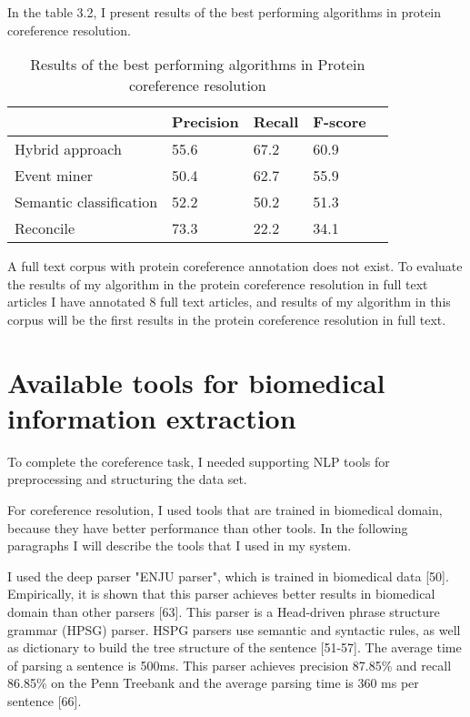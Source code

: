  In the table 3.2, I present results of the best performing algorithms in protein coreference resolution.
\begin{table}[h]
\centering
  \begin{center}
  \centering
 	\begin{tabular}{L{4.2cm} C{2cm} C{2cm} C{2cm}  @{}m{0pt}@{}} 
 		
  		& Precision & Recall & F-score& \\ [1.1ex] 
 		\hline
 		Hybrid approach & 55.6 & 67.2 & 60.9& \\ [1.1ex] 
 		\hline
 		Event miner & 50.4 & 62.7 & 55.9& \\ [1.1ex] 
 		\hline
 		Semantic classification & 52.2 & 50.2 & 51.3& \\ [1.1ex] 
 		\hline
 		Reconcile & 73.3 & 22.2 & 34.1& \\ [1.1ex] 
 		\hline
	\end{tabular}
  \end{center} 
  \caption{Results of the best performing algorithms in Protein coreference resolution}
  \label{table3.2}
\end{table}

A full text corpus with protein coreference annotation does not exist. To evaluate the results of my algorithm in the protein coreference resolution in full text articles I have annotated 8 full text articles, and results of my algorithm in this corpus will be the first  results in the protein coreference resolution in full text.
 
\section{Available tools for biomedical information extraction}

To complete the coreference task, I needed supporting NLP tools for preprocessing and structuring the data set.

For coreference resolution, I used tools that are trained in biomedical domain, because they have better performance than other tools. In the following paragraphs I will describe the tools that I used in my system.

I used the deep parser "ENJU parser", which is trained in biomedical data [50]. Empirically, it is shown that this parser achieves better results in biomedical domain than other parsers [63]. This parser is a Head-driven phrase structure grammar (HPSG) parser. HSPG parsers use semantic and syntactic rules, as well as dictionary to build the tree structure of the sentence [51-57]. The average time of parsing a sentence is 500ms. This parser achieves precision 87.85\% and recall 86.85\% on the Penn Treebank and the average parsing time is 360 ms per sentence [66].

